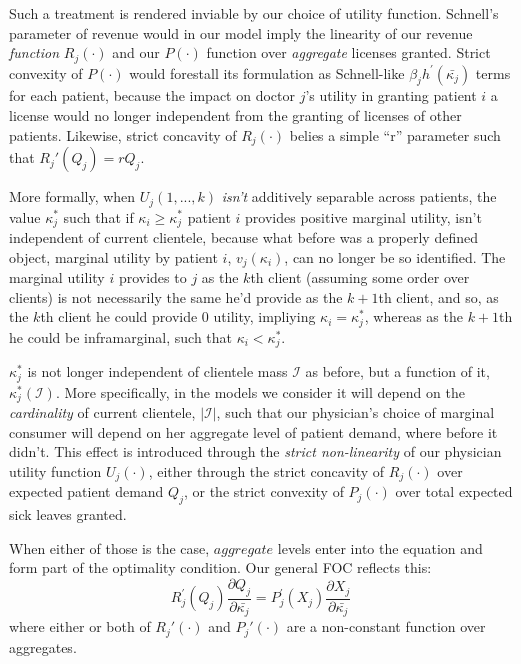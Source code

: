 \documentclass{article}
\begin{document}
Such a treatment is rendered inviable by our choice of utility function. Schnell's parameter of revenue would in our model imply the linearity of our revenue \textit{function} $R_j(\cdot)$ and our $P(\cdot)$ function over \textit{aggregate} licenses granted. Strict convexity of $P(\cdot)$ would forestall its formulation as Schnell-like $\beta_j h^{\prime}(\bar{\kappa_j})$ terms for each patient, because the impact on doctor $j$'s utility in granting patient $i$ a license would no longer independent from the granting of licenses of other patients. Likewise, strict concavity of $R_j(\cdot)$ belies a simple ``r'' parameter such that $R_j'(Q_j) = r Q_j$.

More formally, when $U_j(1,...,k)$ \textit{isn't} additively separable across patients, the value $\kappa_j^*$ such that if $\kappa_i \geq \kappa_j^*$ patient $i$ provides positive marginal utility, isn’t independent of current clientele, because what before was a properly defined object, marginal utility by patient $i$, $v_j(\kappa_i)$, can no longer be so identified. The marginal utility $i$ provides to $j$ as the $k$th client (assuming some order over clients) is not necessarily the same he’d provide as the $k+1$th client, and so, as the $k$th client he could provide $0$ utility, impliying $\kappa_i = \kappa_j^*$, whereas as the $k + 1$th he could be inframarginal, such that $\kappa_i < \kappa_j^*$.

$\kappa_j^*$ is not longer independent of clientele mass $\mathcal{I}$ as before, but a function of it, $\kappa_j^*(\mathcal{I})$. More specifically, in the models we consider it will depend on the \textit{cardinality} of current clientele, $|\mathcal{I}|$, such that our physician's choice of marginal consumer will depend on her aggregate level of patient demand, where before it didn't. This effect is introduced through the \textit{strict non-linearity} of our physician utility function $U_j(\cdot)$, either through the strict concavity of $R_j(\cdot)$ over expected patient demand $Q_j$, or the strict convexity of $P_j(\cdot)$ over total expected sick leaves granted.

When either of those is the case, $aggregate$ levels enter into the equation and form part of the optimality condition. Our general FOC reflects this:
\begin{equation}
 R_j^{\prime}(Q_j)\frac{\partial Q_j}{\partial\bar{\kappa_j}} = P_j^{\prime}(X_j)\frac{\partial X_j}{\partial \bar{\kappa_j}} 
 \label{eq:apx_foc}
\end{equation}
where either or both of $R_j'(\cdot)$ and $P_j'(\cdot)$ are a non-constant function over aggregates.
\end{document}
